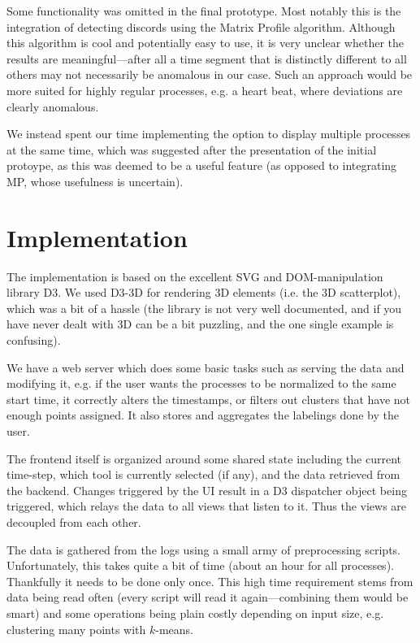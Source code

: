 \documentclass[naustrian]{scrartcl}
\begin{document}
Some functionality was omitted in the final prototype. Most notably this is the
integration of detecting discords using the Matrix Profile algorithm. Although
this algorithm is cool and potentially easy to use, it is very unclear whether
the results are meaningful---after all a time segment that is distinctly
different to all others may not necessarily be anomalous in our case. Such an
approach would be more suited for highly regular processes, e.g. a heart beat,
where deviations are clearly anomalous.

We instead spent our time implementing the option to display multiple processes
at the same time, which was suggested after the presentation of the initial
protoype, as this was deemed to be a useful feature (as opposed to integrating
MP, whose usefulness is uncertain).

\section{Implementation}

The implementation is based on the excellent SVG and DOM-manipulation library D3.
We used D3-3D for rendering 3D elements (i.e. the 3D scatterplot), which was
a bit of a hassle (the library is not very well documented, and if you have never
dealt with 3D can be a bit puzzling, and the one single example is confusing).

We have a web server which does some basic tasks such as serving the data and modifying
it, e.g. if the user wants the processes to be normalized to the same start time, it
correctly alters the timestamps, or filters out clusters that have not enough points assigned.
It also stores and aggregates the labelings done by the user.

The frontend itself is organized around some shared state including the current
time-step, which tool is currently selected (if any), and the data retrieved
from the backend. Changes triggered by the UI result in a D3 dispatcher object
being triggered, which relays the data to all views that listen to it. Thus the
views are decoupled from each other.

The data is gathered from the logs using a small army of preprocessing scripts.
Unfortunately, this takes quite a bit of time (about an hour for all
processes). Thankfully it needs to be done only once. This high time
requirement stems from data being read often (every script will read it
again---combining them would be smart) and some operations being plain costly
depending on input size, e.g. clustering many points with $k$-means.
\end{document}
